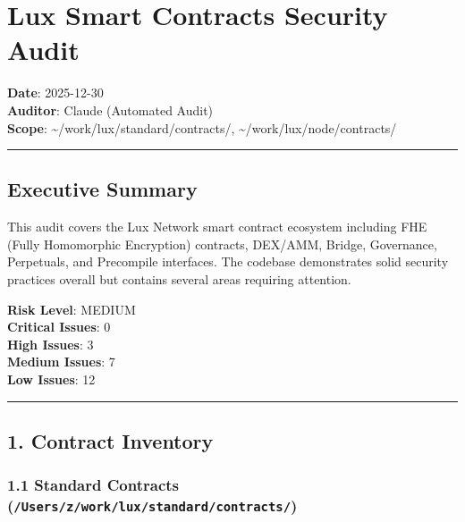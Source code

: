 \documentclass[
]{article}
\author{}
\date{}
\begin{document}
\section{Lux Smart Contracts Security
Audit}\label{lux-smart-contracts-security-audit}

\textbf{Date}: 2025-12-30\\
\textbf{Auditor}: Claude (Automated Audit)\\
\textbf{Scope}: \textasciitilde/work/lux/standard/contracts/,
\textasciitilde/work/lux/node/contracts/

\begin{center}\rule{0.5\linewidth}{0.5pt}\end{center}

\subsection{Executive Summary}\label{executive-summary}

This audit covers the Lux Network smart contract ecosystem including FHE
(Fully Homomorphic Encryption) contracts, DEX/AMM, Bridge, Governance,
Perpetuals, and Precompile interfaces. The codebase demonstrates solid
security practices overall but contains several areas requiring
attention.

\textbf{Risk Level}: MEDIUM\\
\textbf{Critical Issues}: 0\\
\textbf{High Issues}: 3\\
\textbf{Medium Issues}: 7\\
\textbf{Low Issues}: 12

\begin{center}\rule{0.5\linewidth}{0.5pt}\end{center}

\subsection{1. Contract Inventory}\label{1-contract-inventory}

\subsubsection{\texorpdfstring{1.1 Standard Contracts
(\texttt{/Users/z/work/lux/standard/contracts/})}{1.1 Standard Contracts (/Users/z/work/lux/standard/contracts/)}}\label{11-standard-contracts-userszworkluxstandardcontracts}
\end{document}
